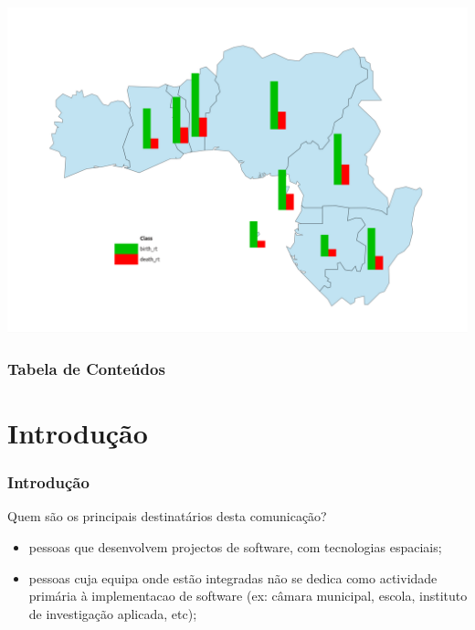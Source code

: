 \documentclass[hyperref={pdfpagelabels=true}]{beamer}
\begin{document}
\begin{frame}
\begin{titlepage}
  \includegraphics[height=.15\textheight]{head2.png}
\end{titlepage}

\end{frame} 
 
\begin{frame}
\frametitle{Tabela de Conte\'{u}dos}
\tiny{
\tableofcontents}
\end{frame}

\section{Introdu\c{c}\~{a}o} 
\begin{frame}
\frametitle{Introdu\c{c}\~{a}o}
Quem s\~{a}o os principais destinat\'{a}rios desta comunica\c{c}\~{a}o?
    \begin{itemize}
      \item<2-> pessoas que desenvolvem projectos de software, com tecnologias espaciais;
      \item<3-> pessoas cuja equipa onde est\~{a}o integradas n\~{a}o se dedica como actividade prim\'{a}ria \`{a} implementacao de software (ex: c\^{a}mara municipal, escola, instituto de investiga\c{c}\~{a}o aplicada, etc);
      \end{itemize}
\end{frame}
\end{document}
